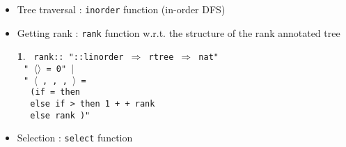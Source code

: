 \documentclass[10pt]{beamer}
\newcommand{\fun}{{\color{isa_blue}{fun}}}
\newcommand{\where}{{\color{isa_green}{where}}}
\newcommand{\generic}[1]{{\color{isa_purple}{\textquotesingle#1}}}
\newcommand{\isa}[1]{\texttt{#1}}
\newcommand{\blue}[1]{{\color{isa_dark_blue}{#1}}}
\newcommand{\green}[1]{{\color{isa_dark_green}{#1}}}
\theoremstyle{definition}
\newtheorem*{isabelle}{}
\begin{document}
\begin{frame}
  \begin{itemize}
    \item<+-> Tree traversal : \texttt{inorder} function (in-order DFS)
    \item<+-> Getting rank : \texttt{rank} function w.r.t. the structure of the rank annotated tree\\
    \begin{isabelle}
      \isa{\small
      \fun{} rank:: "\generic{a}::linorder $\Rightarrow$ \generic{a} rtree $\Rightarrow$ nat" \where{}\\
      $~~~$"\blue{rank} \green{a} $\langle \rangle$ = 0" $|$\\
      $~~~$"\blue{rank} \green{a} $\langle$ \green{l}, \green{n}, \green{x}, \green{r}$\rangle$ = \\
      $~~~~~~$({\color{isa_blue}if} \green{a} = \green{x} {\color{isa_blue}then} \green{n}\\
      $~~~~~~${\color{isa_blue}else if} \green{a} > \green{x} {\color{isa_blue}then} 1 + \green{n} + rank \green{a} \green{r}\\
      $~~~~~~${\color{isa_blue}else} rank \green{a} \green{l})"
      }
    \end{isabelle}
    \item<+-> Selection : \texttt{select} function
  \end{itemize}
\end{frame}
\end{document}
